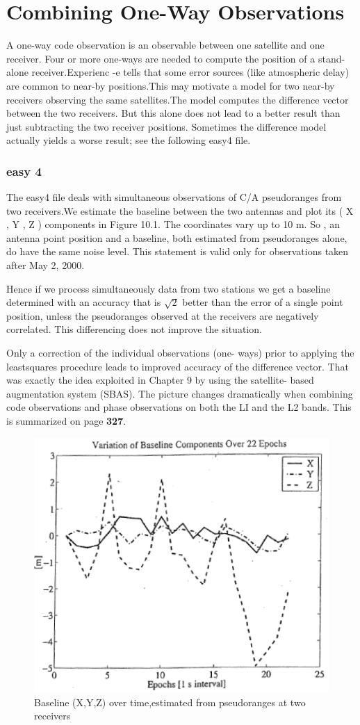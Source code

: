 \section{Combining One-Way Observations}

A one-way code observation is an observable between one satellite and one receiver. Four
or more one-ways are needed to compute the position of a stand-alone receiver.Experienc
-e tells that some error sources (like atmospheric delay) are common to near-by positions.This may motivate a model for two near-by receivers observing the same satellites.The model computes the difference vector between the two receivers. But this alone does not lead to a better result than just subtracting the two receiver positions. Sometimes the difference model actually yields a worse result; see the following easy4 file.

\subsubsection{easy 4}

The easy4 file deals with simultaneous observations of C/A pseudoranges from two receivers.We estimate the baseline between the two antennas and plot its ( X , Y , Z ) components in Figure 10.1. The coordinates vary up to 10 m. So , an antenna point position and a baseline, both estimated from pseudoranges alone, do have the same noise level. This statement is valid only for observations taken after May 2, 2000.

Hence if we process simultaneously data from two stations we get a baseline determined
with an accuracy that is $\sqrt{2}$ better than the error of a single point position, unless the pseudoranges observed at the receivers are negatively correlated. This differencing does not improve the situation.

Only a correction of the individual observations (one- ways) prior to applying the leastsquares procedure leads to improved accuracy of the difference vector. That was exactly the idea exploited in Chapter 9 by using the satellite- based augmentation system (SBAS). The picture changes dramatically when combining code observations and phase observations on both the LI and the L2 bands. This is summarized on page \textbf{327}.

\begin{figure}
	\centering
	\includegraphics[width=0.4\linewidth]{TeX_files/Part03/chapter10/image/9-1}
	\caption{Baseline (X,Y,Z) over time,estimated from pseudoranges at two receivers}
	\label{fig:9-1}
\end{figure}

